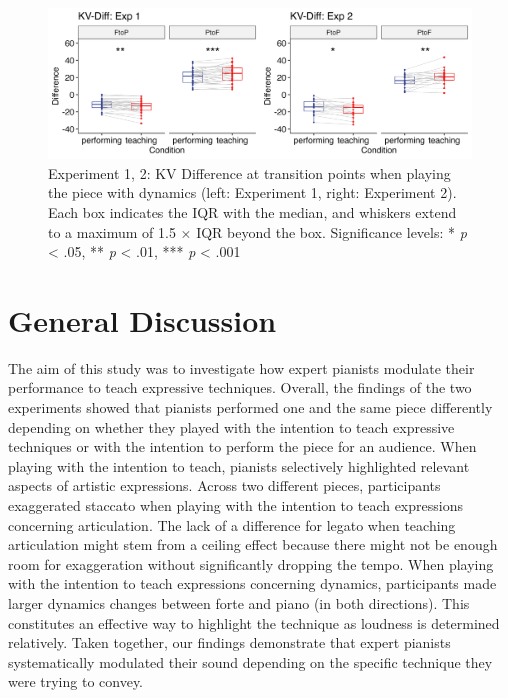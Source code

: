 \documentclass[
  man,floatsintext]{apa6}
\begin{document}
\begin{figure}
\includegraphics[width=1\linewidth]{manuscript_files/figure-latex/plot-vel-diff-1} \caption{\label{fig:vel-diff}Experiment 1, 2: KV Difference at transition points when playing the piece with dynamics (left: Experiment 1, right: Experiment 2). Each box indicates the IQR with the median, and whiskers extend to a maximum of 1.5 × IQR beyond the box. Significance levels: * \textit{p} < .05, ** \textit{p} < .01, *** \textit{p} < .001}\label{fig:plot-vel-diff}
\end{figure}

\newpage

\hypertarget{general-discussion}{%
\section{General Discussion}\label{general-discussion}}

The aim of this study was to investigate how expert pianists modulate their performance to teach expressive techniques. Overall, the findings of the two experiments showed that pianists performed one and the same piece differently depending on whether they played with the intention to teach expressive techniques or with the intention to perform the piece for an audience. When playing with the intention to teach, pianists selectively highlighted relevant aspects of artistic expressions. Across two different pieces, participants exaggerated staccato when playing with the intention to teach expressions concerning articulation. The lack of a difference for legato when teaching articulation might stem from a ceiling effect because there might not be enough room for exaggeration without significantly dropping the tempo. When playing with the intention to teach expressions concerning dynamics, participants made larger dynamics changes between forte and piano (in both directions). This constitutes an effective way to highlight the technique as loudness is determined relatively. Taken together, our findings demonstrate that expert pianists systematically modulated their sound depending on the specific technique they were trying to convey.
\end{document}
